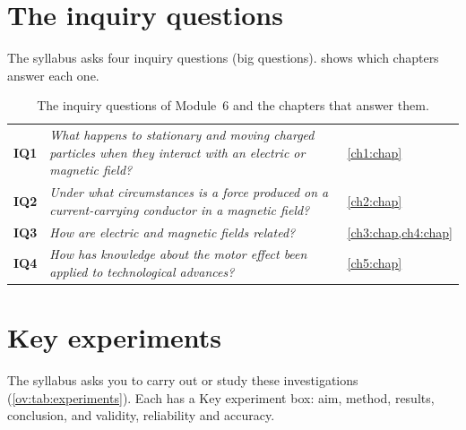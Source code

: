 \section*{The inquiry questions}

The syllabus asks four inquiry questions (big questions).  shows which
chapters answer each one.

\begin{table}
  \caption{The inquiry questions of Module~6 and the chapters that answer them.}
  \label{ov:tab:iq}
  \centering
  \small
  \begin{tabular}{@{}L{10mm}L{97mm}L{33mm}@{}}
    \toprule
    &  & \\
    \midrule
    \textbf{IQ1} & \emph{What happens to stationary and moving charged particles when they
      interact with an electric or magnetic field?} & \cref{ch1:chap}\\
    \textbf{IQ2} & \emph{Under what circumstances is a force produced on a current-carrying
      conductor in a magnetic field?} & \cref{ch2:chap}\\
    \textbf{IQ3} & \emph{How are electric and magnetic fields related?}
      & \cref{ch3:chap,ch4:chap}\\
    \textbf{IQ4} & \emph{How has knowledge about the motor effect been applied to
      technological advances?} & \cref{ch5:chap}\\
    \bottomrule
  \end{tabular}
\end{table}

\section*{Key experiments}

The syllabus asks you to carry out or study these investigations (\cref{ov:tab:experiments}).
Each has a Key experiment box: aim, method, results, conclusion, and validity, reliability
and accuracy.

